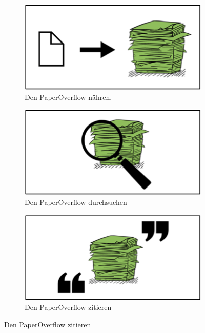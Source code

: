\documentclass[a4paper,12pt]{article}
\begin{document}
\renewcommand\thesubfigure{\arabic{subfigure}}
\begin{figure}[h!]
  \centering
  \begin{subfigure}[b]{0.32\linewidth}
    \includegraphics[width=\linewidth]{res/step1.png}
    \caption{Den PaperOverflow nähren.}
  \end{subfigure}
  \begin{subfigure}[b]{0.32\linewidth}
    \includegraphics[width=\linewidth]{res/step2.png}
    \caption{Den PaperOverflow durchsuchen}
  \end{subfigure}
  \begin{subfigure}[b]{0.32\linewidth}
    \includegraphics[width=\linewidth]{res/step3.png}
    \caption{Den PaperOverflow zitieren}
  \end{subfigure}
\end{figure}
\end{document}
